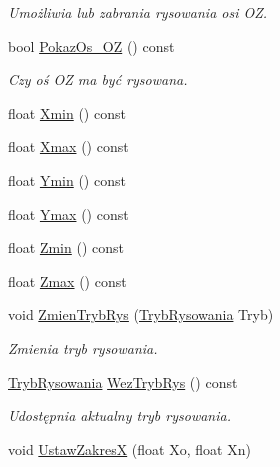 \begin{DoxyCompactItemize}
\begin{DoxyCompactList}\small\item\em Umożliwia lub zabrania rysowania osi OZ. \end{DoxyCompactList}\item 
bool \mbox{\hyperlink{class_pz_g_1_1_lacze_do_g_n_u_plota_a22c708af33c57bf3b5d1b4e82b4017b7}{Pokaz\+Os\+\_\+\+OZ}} () const
\begin{DoxyCompactList}\small\item\em Czy oś OZ ma być rysowana. \end{DoxyCompactList}\item 
float \mbox{\hyperlink{class_pz_g_1_1_lacze_do_g_n_u_plota_a66836c9749bf179420e4ca3e9447efd7}{Xmin}} () const
\item 
float \mbox{\hyperlink{class_pz_g_1_1_lacze_do_g_n_u_plota_a8e23479629af3df3d352b7839ae396b8}{Xmax}} () const
\item 
float \mbox{\hyperlink{class_pz_g_1_1_lacze_do_g_n_u_plota_a9352c0382bfaeaaba9f65399a7383164}{Ymin}} () const
\item 
float \mbox{\hyperlink{class_pz_g_1_1_lacze_do_g_n_u_plota_ac54e4e7448ce3bd324efdc94a999f535}{Ymax}} () const
\item 
float \mbox{\hyperlink{class_pz_g_1_1_lacze_do_g_n_u_plota_a9068bd9a9873ba9c6d70016f1ae7cd7f}{Zmin}} () const
\item 
float \mbox{\hyperlink{class_pz_g_1_1_lacze_do_g_n_u_plota_a20a5d03e1fc19c682032bffc54340f12}{Zmax}} () const
\item 
void \mbox{\hyperlink{class_pz_g_1_1_lacze_do_g_n_u_plota_a10950349b348fd3a3d4143e95337527c}{Zmien\+Tryb\+Rys}} (\mbox{\hyperlink{namespace_pz_g_aeedae1ef10c66d720f9e89de408ca4ca}{Tryb\+Rysowania}} Tryb)
\begin{DoxyCompactList}\small\item\em Zmienia tryb rysowania. \end{DoxyCompactList}\item 
\mbox{\hyperlink{namespace_pz_g_aeedae1ef10c66d720f9e89de408ca4ca}{Tryb\+Rysowania}} \mbox{\hyperlink{class_pz_g_1_1_lacze_do_g_n_u_plota_a7c417f27b4b112f58a5be3ce6ea8d1fe}{Wez\+Tryb\+Rys}} () const
\begin{DoxyCompactList}\small\item\em Udostępnia aktualny tryb rysowania. \end{DoxyCompactList}\item 
void \mbox{\hyperlink{class_pz_g_1_1_lacze_do_g_n_u_plota_a9c91987dfc869d6fcea96205c581daef}{Ustaw\+ZakresX}} (float Xo, float Xn)

\end{DoxyCompactItemize}

